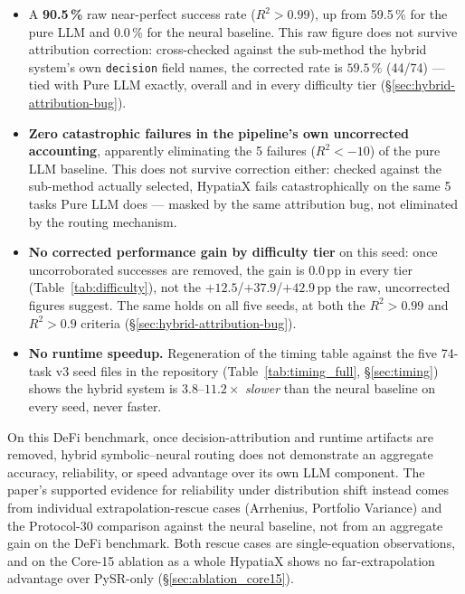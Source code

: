 \documentclass[twoside,11pt]{article}
\newcommand{\Rsq}{R^{2}}
\begin{document}
\begin{itemize}
  \item A \textbf{90.5\,\%} raw near-perfect success rate ($\Rsq > 0.99$), up from
    59.5\,\% for the pure LLM and 0.0\,\% for the neural baseline. This raw
    figure does not survive attribution correction: cross-checked against the
    sub-method the hybrid system's own \texttt{decision} field names, the
    corrected rate is $59.5\,\%$ (44/74) --- tied with Pure LLM exactly,
    overall and in every difficulty tier (\S\ref{sec:hybrid-attribution-bug}).
  \item \textbf{Zero catastrophic failures in the pipeline's own uncorrected
    accounting}, apparently eliminating the 5 failures ($\Rsq < -10$) of the
    pure LLM baseline. This does not survive correction either: checked
    against the sub-method actually selected, HypatiaX fails catastrophically
    on the same 5 tasks Pure LLM does --- masked by the same attribution bug,
    not eliminated by the routing mechanism.
  \item \textbf{No corrected performance gain by difficulty tier} on this
    seed: once uncorroborated successes are removed, the gain is $0.0$\,pp in
    every tier (Table~\ref{tab:difficulty}), not the $+12.5$/$+37.9$/$+42.9$\,pp
    the raw, uncorrected figures suggest. The same holds on all five seeds, at both the $\Rsq>0.99$ and
    $\Rsq>0.9$ criteria (\S\ref{sec:hybrid-attribution-bug}).
  \item \textbf{No runtime speedup.} Regeneration of the timing table against the five 74-task v3 seed files in the
    repository (Table~\ref{tab:timing_full}, \S\ref{sec:timing}) shows the hybrid
    system is $3.8$--$11.2\times$ \emph{slower} than the neural baseline on
    every seed, never faster.
\end{itemize}

On this DeFi benchmark, once decision-attribution and runtime artifacts are
removed, hybrid symbolic--neural routing does not demonstrate an aggregate
accuracy, reliability, or speed advantage over its own LLM component. The
paper's supported evidence for reliability under distribution shift instead
comes from individual extrapolation-rescue cases (Arrhenius, Portfolio
Variance) and the Protocol-30 comparison against the neural baseline, not
from an aggregate gain on the DeFi benchmark. Both rescue cases are single-equation observations,
and on the Core-15 ablation as a whole HypatiaX shows no far-extrapolation advantage over PySR-only
(\S\ref{sec:ablation_core15}).
\end{document}
